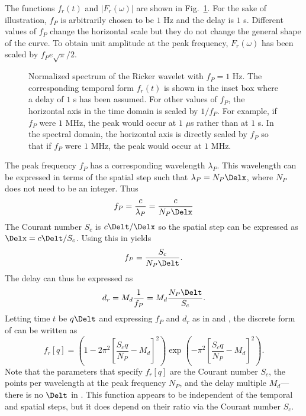 The functions $f_r(t)$ and $|F_r(\omega)|$ are shown in Fig.\
\ref{fig:p-of-t-and-omega}.  For the sake of illustration, $f_P$ is
arbitrarily chosen to be $1$ Hz and the delay is $1$ s.  Different
values of $f_P$ change the horizontal scale but they do not change the
general shape of the curve.  To obtain unit amplitude at the peak
frequency, $F_r(\omega)$ has been scaled by $f_P e\sqrt{\pi}/2$.
\begin{figure}
  \begin{center}
  \end{center}
  \vspace{-.25in}
  \caption{Normalized spectrum of the Ricker wavelet with $f_P = 1$
  Hz.  The corresponding temporal form $f_r(t)$ is shown in the inset
  box where a delay of $1$ s has been assumed.  For other values of
  $f_P$, the horizontal axis in the time 
  domain is scaled by $1/f_P$.  For example, if $f_P$ were $1$ MHz,
  the peak would occur at $1$ $\mu$s rather than at $1$ s.  In the
  spectral domain, the horizontal axis is directly scaled by $f_P$ so
  that if $f_P$ were $1$ MHz, the peak would occur at $1$ MHz.}
  \label{fig:p-of-t-and-omega}
\end{figure}

The peak frequency $f_P$ has a corresponding wavelength $\lambda_P$.
This wavelength can be expressed in terms of the spatial step such
that $\lambda_P = N_P\Delx$, where $N_P$ does not need to be an
integer.  Thus
\begin{equation}
  f_P = \frac{c}{\lambda_P} = \frac{c}{N_P \Delx}
  \label{eq:peakExpression}
\end{equation}
The Courant number $S_c$ is $c\Delt/\Delx$ so the spatial step can be
expressed as $\Delx = c \Delt/S_c$.  Using this in
 yields
\begin{equation}
  f_P = \frac{S_c}{N_P \Delt}.
  \label{eq:fp-equiv}
\end{equation}
The delay can thus be expressed as
\begin{equation}
  d_r = M_d\frac{1}{f_P} = M_d \frac{N_P \Delt}{S_c}.
 \label{eq:dr-equiv}
\end{equation}
Letting time $t$ be $q\Delt$ and expressing $f_P$ and $d_r$ as in
\refeq{eq:fp-equiv} and \refeq{eq:dr-equiv}, the discrete form of
\refeq{eq:rickerTime} can be written
as
\begin{equation}
  f_r[q] =
  \left(1-
  2 \pi^2 \left[\frac{S_c q}{N_P} - M_d\right]^2\right)
  \exp\left(-\pi^2 \left[\frac{S_c q}{N_P} - M_d\right]^2\right).
  \label{eq:rickerDiscrete}
\end{equation}
Note that the parameters that specify $f_r[q]$ are the Courant number
$S_c$, the points per wavelength at the peak frequency $N_P$, and the
delay multiple $M_d$---there is no $\Delt$ in
.  This function appears to be independent of
the temporal and spatial steps, but it does depend on their ratio via
the Courant number $S_c$.

